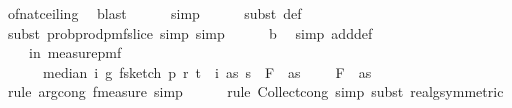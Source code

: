 \begin{isabellebody}
\ of{\isacharunderscore}{\kern0pt}nat{\isacharunderscore}{\kern0pt}ceiling\ \isamarkupfalse%
\ blast\isanewline
\ \ \ \ \isamarkupfalse%
\ simp\isanewline
\ \ \ \ \isamarkupfalse%
\ {\isacharparenleft}{\kern0pt}subst\ {\isasymOmega}def{\isacharparenright}{\kern0pt}\isanewline
\ \ \ \ \isamarkupfalse%
\ {\isacharparenleft}{\kern0pt}subst\ prob{\isacharunderscore}{\kern0pt}prod{\isacharunderscore}{\kern0pt}pmf{\isacharunderscore}{\kern0pt}slice{\isacharcomma}{\kern0pt}\ simp{\isacharcomma}{\kern0pt}\ simp{\isacharparenright}{\kern0pt}\isanewline
\ \ \ \ \isamarkupfalse%
\ b\ \isamarkupfalse%
\ {\isacharparenleft}{\kern0pt}simp\ add{\isacharcolon}{\kern0pt}{\isasymOmega}def{\isacharparenright}{\kern0pt}\ \isanewline
\ \ \isamarkupfalse%
\ \isamarkupfalse%
\ {\isachardoublequoteopen}{\isachardot}{\kern0pt}{\isachardot}{\kern0pt}{\isachardot}{\kern0pt}\ {\isacharequal}{\kern0pt}\ {\isasymP}{\isacharparenleft}{\kern0pt}{\isasymomega}\ in\ measure{\isacharunderscore}{\kern0pt}pmf\ {\isasymOmega}\ \isanewline
\ \ \ \ \ \ {\isasymbar}median\ {\isacharparenleft}{\kern0pt}{\isasymlambda}i{\isachardot}{\kern0pt}\ g\ {\isacharparenleft}{\kern0pt}f{}{\isacharunderscore}{\kern0pt}sketch\ p\ r\ t\ {\isacharparenleft}{\kern0pt}{\isasymomega}\ i{\isacharparenright}{\kern0pt}\ as{\isacharparenright}{\kern0pt}{\isacharparenright}{\kern0pt}\ s\ {\isacharminus}{\kern0pt}\ F\ {}\ as{\isasymbar}\ {\isasymle}\ \ {\isasymdelta}\ {\isacharasterisk}{\kern0pt}\ F\ {}\ as{\isacharparenright}{\kern0pt}{\isachardoublequoteclose}\isanewline
\ \ \ \ \isamarkupfalse%
\ {\isacharparenleft}{\kern0pt}rule\ arg{\isacharunderscore}{\kern0pt}cong{}{\isacharbrackleft}{\kern0pt}\ f{\isacharequal}{\kern0pt}{\isachardoublequoteopen}measure{\isachardoublequoteclose}{\isacharbrackright}{\kern0pt}{\isacharcomma}{\kern0pt}\ simp{\isacharparenright}{\kern0pt}\isanewline
\ \ \ \ \isamarkupfalse%
\ {\isacharparenleft}{\kern0pt}rule\ Collect{\isacharunderscore}{\kern0pt}cong{\isacharcomma}{\kern0pt}\ simp{\isacharcomma}{\kern0pt}\ subst\ real{\isacharunderscore}{\kern0pt}g{\isacharbrackleft}{\kern0pt}symmetric{\isacharbrackright}{\kern0pt}{\isacharparenright}{\kern0pt}\isanewline
\ \ \ \ \isamarkupfalse%

\end{isabellebody}
